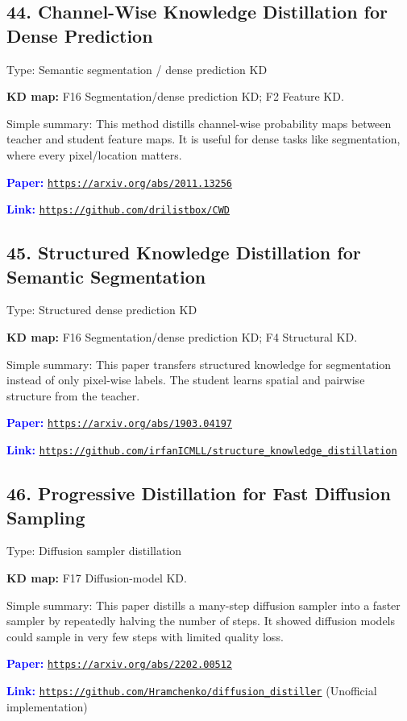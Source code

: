 \documentclass[10pt]{article}
\begin{document}
\subsection*{44. Channel-Wise Knowledge Distillation for Dense Prediction}
Type: Semantic segmentation / dense prediction KD\par
\textbf{KD map:} F16 Segmentation/dense prediction KD; F2 Feature KD.\par
Simple summary: This method distills channel-wise probability maps between teacher and student feature maps. It is useful for dense tasks like segmentation, where every pixel/location matters.\par
\textcolor{blue}{\textbf{Paper:}} \href{https://arxiv.org/abs/2011.13256}{\nolinkurl{https://arxiv.org/abs/2011.13256}}\par
\textcolor{blue}{\textbf{Link:}} \href{https://github.com/drilistbox/CWD}{\nolinkurl{https://github.com/drilistbox/CWD}}\par

\subsection*{45. Structured Knowledge Distillation for Semantic Segmentation}
Type: Structured dense prediction KD\par
\textbf{KD map:} F16 Segmentation/dense prediction KD; F4 Structural KD.\par
Simple summary: This paper transfers structured knowledge for segmentation instead of only pixel-wise labels. The student learns spatial and pairwise structure from the teacher.\par
\textcolor{blue}{\textbf{Paper:}} \href{https://arxiv.org/abs/1903.04197}{\nolinkurl{https://arxiv.org/abs/1903.04197}}\par
\textcolor{blue}{\textbf{Link:}} \href{https://github.com/irfanICMLL/structure_knowledge_distillation}{\nolinkurl{https://github.com/irfanICMLL/structure_knowledge_distillation}}\par

\subsection*{46. Progressive Distillation for Fast Diffusion Sampling}
Type: Diffusion sampler distillation\par
\textbf{KD map:} F17 Diffusion-model KD.\par
Simple summary: This paper distills a many-step diffusion sampler into a faster sampler by repeatedly halving the number of steps. It showed diffusion models could sample in very few steps with limited quality loss.\par
\textcolor{blue}{\textbf{Paper:}} \href{https://arxiv.org/abs/2202.00512}{\nolinkurl{https://arxiv.org/abs/2202.00512}}\par
\textcolor{blue}{\textbf{Link:}} \href{https://github.com/Hramchenko/diffusion_distiller}{\nolinkurl{https://github.com/Hramchenko/diffusion_distiller}} (Unofficial implementation)\par
\end{document}
